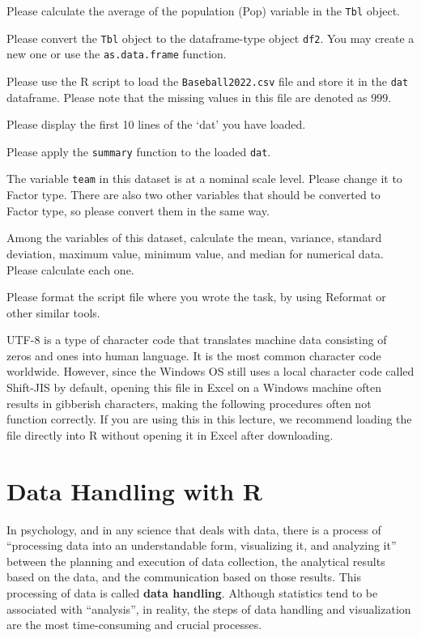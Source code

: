 \documentclass[
  a4paper,
]{book}
\begin{document}
Please calculate the average of the population (Pop) variable in the
\texttt{Tbl} object.

Please convert the \texttt{Tbl} object to the dataframe-type object
\texttt{df2}. You may create a new one or use the \texttt{as.data.frame}
function.

Please use the R script to load the \texttt{Baseball2022.csv} file and
store it in the \texttt{dat} dataframe. Please note that the missing
values in this file are denoted as \(999\).

Please display the first 10 lines of the `dat' you have loaded.

Please apply the \texttt{summary} function to the loaded \texttt{dat}.

The variable \texttt{team} in this dataset is at a nominal scale level.
Please change it to Factor type. There are also two other variables that
should be converted to Factor type, so please convert them in the same
way.

Among the variables of this dataset, calculate the mean, variance,
standard deviation, maximum value, minimum value, and median for
numerical data. Please calculate each one.

Please format the script file where you wrote the task, by using
Reformat or other similar tools.

UTF-8 is a type of character code that translates machine data
consisting of zeros and ones into human language. It is the most common
character code worldwide. However, since the Windows OS still uses a
local character code called Shift-JIS by default, opening this file in
Excel on a Windows machine often results in gibberish characters, making
the following procedures often not function correctly. If you are using
this in this lecture, we recommend loading the file directly into R
without opening it in Excel after downloading.


\chapter{Data Handling with R}\label{data-handling-with-r}

In psychology, and in any science that deals with data, there is a
process of ``processing data into an understandable form, visualizing
it, and analyzing it'' between the planning and execution of data
collection, the analytical results based on the data, and the
communication based on those results. This processing of data is called
\textbf{data handling}. Although statistics tend to be associated with
``analysis'', in reality, the steps of data handling and visualization
are the most time-consuming and crucial processes.
\end{document}
